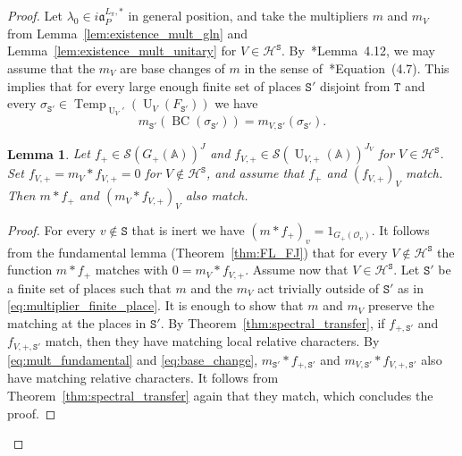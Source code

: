 \documentclass[letterpaper,11pt]{amsart}
\newcommand{\fa}{\mathfrak{a}}
\newcommand{\bA}{\mathbb{A}}
\newcommand{\cH}{\mathcal{H}}
\newcommand{\cO}{\mathcal{O}}
\newcommand{\cS}{\mathcal{S}}
\newcommand{\tS}{\mathtt{S}}
\newcommand{\tT}{\mathtt{T}}
\newcommand{\<}{\negthickspace}
\DeclareMathOperator{\U}{U}
\DeclareMathOperator{\BC}{BC}
\DeclareMathOperator{\Temp}{Temp} \DeclareMathOperator{\temp}{temp}
\theoremstyle{definition}
\theoremstyle{plain}
\newtheorem{lemma}[definition]{Lemma}
\theoremstyle{remark}
\numberwithin{equation}{section}
\begin{document}
\begin{proof}
    Let $\lambda_0 \in i \fa_{P}^{L_\pi,*}$ in general position, and take the multipliers $m$ and $m_V$ from Lemma~\ref{lem:existence_mult_gln} and Lemma~\ref{lem:existence_mult_unitary} for $V \in \cH^\tS$. By~\cite{BPLZZ}*{Lemma~4.12}, we may assume that the $m_V$ are base changes of $m$ in the sense of~\cite{BPLZZ}*{Equation~(4.7)}. This implies that for every large enough finite set of places $\tS'$ disjoint from $\tT$ and every $\sigma_{\tS'} \in \Temp_{\U_V'}(\U_V(F_{\tS'}))$ we have
    \begin{equation}
        \label{eq:base_change}
        m_{\tS'}(\BC(\sigma_{\tS'}))=m_{V,{\tS'}}(\sigma_{\tS'}).
    \end{equation}

    \begin{lemma}
    \label{lemma:multiplier_transfer}
        Let $f_+ \in \cS(G_+(\bA))^{J}$ and $f_{V,+} \in \cS(\U_{V,+}(\bA))^{J_{V}}$  for $V \in \cH^\tS$. Set $f_{V,+}=m_V* f_{V,+}=0$ for $V \notin \cH^\tS$, and assume that $f_+$ and $(f_{V,+})_V$ match. Then $m*f_+$ and $(m_V* f_{V,+})_V$ also match.
    \end{lemma}

    \begin{proof}
    For every $v \notin \tS$ that is inert we have $(m*f_+)_v=1_{G_+(\cO_v)}$. It follows from the fundamental lemma (Theorem~\ref{thm:FL_FJ}) that for every $V \notin \cH^\tS$ the function $m*f_+$ matches with $0=m_V*f_{V,+}$. Assume now that $V \in \cH^\tS$. Let $\tS'$ be a finite set of places such that $m$ and the $m_V$ act trivially outside of $\tS'$ as in \eqref{eq:multiplier_finite_place}. It is enough to show that $m$ and $m_V$ preserve the matching at the places in $\tS'$. By Theorem~\ref{thm:spectral_transfer}, if $f_{+,\tS'}$ and $f_{V,+,\tS'}$ match, then they have matching local relative characters. By \eqref{eq:mult_fundamental} and \eqref{eq:base_change}, $m_{\tS'}*f_{+,\tS'}$ and $m_{V,{\tS'}}*f_{V,+,\tS'}$ also have matching relative characters. It follows from Theorem~\ref{thm:spectral_transfer} again that they match, which concludes the proof.
    \end{proof}


\end{proof}
\end{document}
